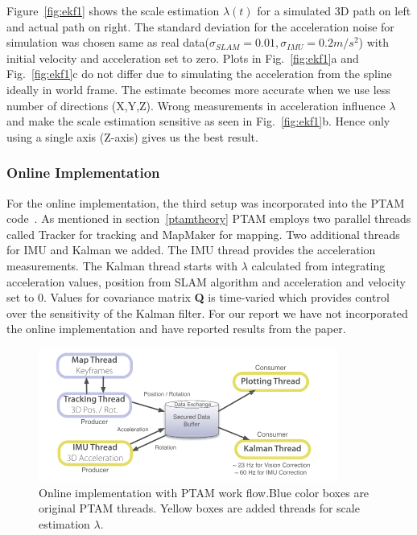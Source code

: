 Figure~\ref{fig:ekf1} shows the scale estimation $\lambda(t)$ for a simulated 3D path on left and actual path on right. The standard deviation for the acceleration noise for simulation was chosen same as real data($\sigma_{SLAM} = 0.01, \sigma_{IMU} = 0.2 m/s^2$) with initial velocity and acceleration set to zero. Plots in Fig.~\ref{fig:ekf1}a and Fig.~\ref{fig:ekf1}c do not differ due to simulating the acceleration from the spline ideally in world frame. The estimate becomes more accurate when we use less number of directions (X,Y,Z).  Wrong measurements in acceleration influence $\lambda$ and make the scale estimation sensitive as seen in Fig.~\ref{fig:ekf1}b. Hence only using a single axis (Z-axis) gives us the best result. 


\subsubsection{Online Implementation}

For the online implementation, the third setup was incorporated into the PTAM code~\cite{ptamcode}. As mentioned in section~\ref{ptamtheory} PTAM employs two parallel threads called Tracker for tracking and MapMaker for mapping. Two additional threads for IMU and Kalman we added. The IMU thread provides the acceleration measurements. The Kalman thread starts with $\lambda$ calculated from integrating acceleration values, position from SLAM algorithm and acceleration and velocity set to 0. Values for covariance matrix \textbf{Q} is time-varied which provides control over the sensitivity of the Kalman filter. For our report we have not incorporated the online implementation and have reported results from the paper. 

\begin{figure}
  \includegraphics[width=\textwidth]{./figures/onlineEKF.png}
\caption{Online implementation with PTAM work flow.Blue color boxes are original PTAM threads. Yellow boxes are added threads for scale estimation $\lambda$.~\cite{nutzi2011fusion}}
\label{fig:ekf2}       %
\end{figure}
